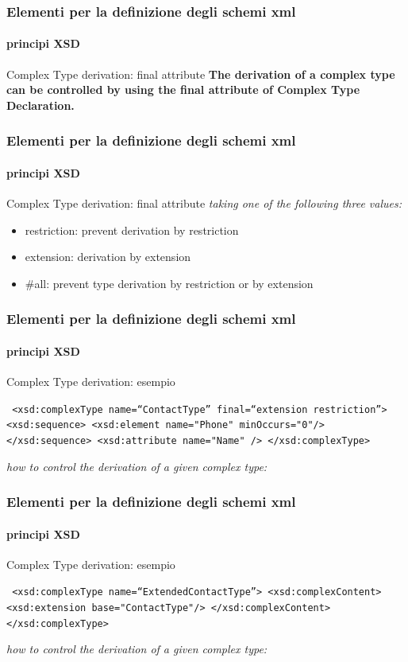 \begin{frame}
	\frametitle{Elementi per la definizione degli schemi xml}
	\framesubtitle{principi XSD}
	\addtocounter{nframe}{1}

	\begin{block}{Complex Type derivation: final attribute}
		\textbf{The derivation of a complex type can be controlled by using the final attribute of Complex Type Declaration.}
	\end{block}

\end{frame}

\begin{frame}
	\frametitle{Elementi per la definizione degli schemi xml}
	\framesubtitle{principi XSD}
	\addtocounter{nframe}{1}

	\begin{block}{Complex Type derivation: final attribute}
		\textit{taking one of the following three values:}
		\begin{itemize}
			\item restriction: prevent derivation by restriction
			\item extension: derivation by extension
			\item \#all: prevent type derivation by restriction or by extension
		\end{itemize}

	\end{block}

\end{frame}

\begin{frame}
	\frametitle{Elementi per la definizione degli schemi xml}
	\framesubtitle{principi XSD}
	\addtocounter{nframe}{1}

	\begin{block}{Complex Type derivation: esempio}

		\texttt{
			<xsd:complexType name=``ContactType'' final=``extension restriction''>
			<xsd:sequence>
			<xsd:element name="Phone" minOccurs="0"/>
			</xsd:sequence>
			<xsd:attribute name="Name" />
			</xsd:complexType>
		}
	\end{block}
	\textit{how to control the derivation of a given complex type: }
\end{frame}

\begin{frame}
	\frametitle{Elementi per la definizione degli schemi xml}
	\framesubtitle{principi XSD}
	\addtocounter{nframe}{1}

	\begin{block}{Complex Type derivation: esempio}

		\texttt{
			<xsd:complexType name=``ExtendedContactType''>
			<xsd:complexContent>
			<xsd:extension base="ContactType"/>
			</xsd:complexContent>
			</xsd:complexType>
		}
	\end{block}
	\textit{how to control the derivation of a given complex type: }
\end{frame}

